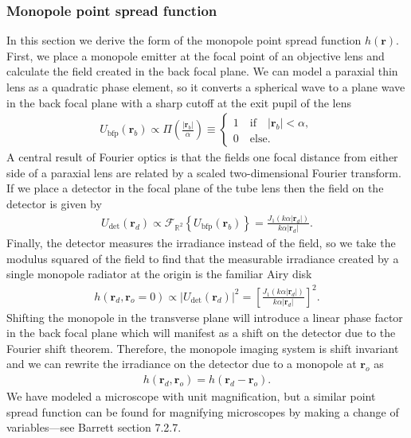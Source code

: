 \documentclass{osa-article}
\providecommand{\mb}[1]{\mathbf{#1}}
\providecommand{\mc}[1]{\mathcal{#1}}
\providecommand{\ro}{\mathbf{\mathbf{r}}_o}
\providecommand{\rd}{\mathbf{r}_d}
\providecommand{\mbb}[1]{\mathbb{#1}}
\begin{document}
\subsubsection{Monopole point spread function}
In this section we derive the form of the monopole point spread function $h(\mb{r})$.
First, we place a monopole emitter at the focal point of an objective lens and
calculate the field created in the back focal plane. We can model a paraxial
thin lens as a quadratic phase element, so it converts a spherical wave to a
plane wave in the back focal plane with a sharp cutoff at the exit pupil of the
lens
\begin{align}
  U_{\text{bfp}}(\mb{r}_b) \propto \Pi\left(\frac{|\mb{r}_b|}{\alpha}\right) \equiv
  \begin{cases}
    1\quad \text{if}\quad |\mb{r}_b| < \alpha,\\
    0\quad \text{else}.
  \end{cases}
\end{align}
A central result of Fourier optics is that the fields one focal distance from
either side of a paraxial lens are related by a scaled two-dimensional Fourier
transform. If we place a detector in the focal plane of the tube lens then the
field on the detector is given by
\begin{align}
  U_{\text{det}}(\mb{r}_d) \propto \mc{F}_{\mbb{R}^2}\left\{U_{\text{bfp}}(\mb{r}_b)\right\} = \frac{J_1(k\alpha|\mb{r}_d|)}{k\alpha|\mb{r}_d|}.
\end{align}
Finally, the detector measures the irradiance instead of the field, so we take
the modulus squared of the field to find that the measurable irradiance created
by a single monopole radiator at the origin is the familiar Airy disk
\begin{align}
  h(\mb{r}_d, \ro = 0) \propto |U_{\text{det}}(\mb{r}_d)|^2 = \left[\frac{J_1(k\alpha|\mb{r}_d|)}{k\alpha|\mb{r}_d|}\right]^2.
\end{align}
Shifting the monopole in the transverse plane will introduce a linear phase
factor in the back focal plane which will manifest as a shift on the detector
due to the Fourier shift theorem. Therefore, the monopole imaging system is
shift invariant and we can rewrite the irradiance on the detector due to a
monopole at $\ro$ as
\begin{align}
  h(\rd, \ro) = h(\rd - \ro). \label{eq:shift}
\end{align}
We have modeled a microscope with unit magnification, but a similar point spread
function can be found for magnifying microscopes by making a change of
variables---see Barrett section 7.2.7.
\end{document}
